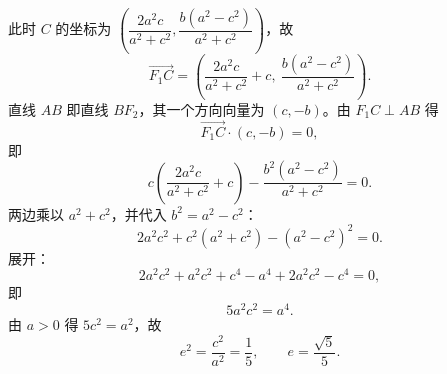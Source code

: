 \begin{answer}
此时 $C$ 的坐标为 $\left(\dfrac{2a^2c}{a^2+c^2},\dfrac{b(a^2-c^2)}{a^2+c^2}\right)$，故
\nopagebreak[4]
\[\overrightarrow{F_1C}=\left(\frac{2a^2c}{a^2+c^2}+c,\ \frac{b(a^2-c^2)}{a^2+c^2}\right).\]
直线 $AB$ 即直线 $BF_2$，其一个方向向量为 $(c,-b)$。由 $F_1C\perp AB$ 得
\nopagebreak[4]
\[\overrightarrow{F_1C}\cdot(c,-b)=0,\]
即
\nopagebreak[4]
\[c\left(\frac{2a^2c}{a^2+c^2}+c\right)-\frac{b^2(a^2-c^2)}{a^2+c^2}=0.\]
两边乘以 $a^2+c^2$，并代入 $b^2=a^2-c^2$：
\nopagebreak[4]
\[2a^2c^2+c^2(a^2+c^2)-(a^2-c^2)^2=0.\]
展开：
\nopagebreak[4]
\[2a^2c^2+a^2c^2+c^4-a^4+2a^2c^2-c^4=0,\]
即
\nopagebreak[4]
\[5a^2c^2=a^4.\]
由 $a>0$ 得 $5c^2=a^2$，故
\nopagebreak[4]
\[e^2=\frac{c^2}{a^2}=\frac15,\qquad e=\frac{\sqrt5}5.\]



\end{answer}
